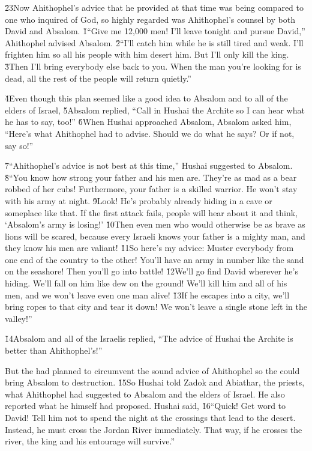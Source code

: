 \v{23}Now Ahithophel's advice that he provided at that time was being compared to one who inquired of God, so highly regarded was Ahithophel's counsel by both David and Absalom.
\v{1}``Give me 12,000 men! I'll leave tonight and pursue David,'' Ahithophel advised Absalom. \v{2}``I'll catch him while he is still tired and weak. I'll frighten him so all his people with him desert him. But I'll only kill the king. \v{3}Then I'll bring everybody else back to you. When the man you're looking for is dead, all the rest of the people will return quietly.''

\v{4}Even though this plan seemed like a good idea to Absalom and to all of the elders of Israel, \v{5}Absalom replied, ``Call in Hushai the Archite so I can hear what he has to say, too!'' \v{6}When Hushai approached Absalom, Absalom asked him, ``Here's what Ahithophel had to advise. Should we do what he says? Or if not, say so!''

\v{7}``Ahithophel's advice is not best at this time,'' Hushai suggested to Absalom. \v{8}``You know how strong your father and his men are. They're as mad as a bear robbed of her cubs! Furthermore, your father is a skilled warrior. He won't stay with his army at night. \v{9}Look! He's probably already hiding in a cave or someplace like that. If the first attack fails, people will hear about it and think, `Absalom's army is losing!' \v{10}Then even men who would otherwise be as brave as lions will be scared, because every Israeli knows your father is a mighty man, and they know his men are valiant! \v{11}So here's my advice: Muster everybody from one end of the country to the other! You'll have an army in number like the sand on the seashore! Then you'll go into battle! \v{12}We'll go find David wherever he's hiding. We'll fall on him like dew on the ground! We'll kill him and all of his men, and we won't leave even one man alive! \v{13}If he escapes into a city, we'll bring ropes to that city and tear it down! We won't leave a single stone left in the valley!''

\v{14}Absalom and all of the Israelis replied, ``The advice of Hushai the Archite is better than Ahithophel's!''

But the  had planned to circumvent the sound advice of Ahithophel so the  could bring Absalom to destruction. \v{15}So Hushai told Zadok and Abiathar, the priests, what Ahithophel had suggested to Absalom and the elders of Israel. He also reported what he himself had proposed. Hushai said, \v{16}``Quick! Get word to David! Tell him not to spend the night at the crossings that lead to the desert. Instead, he must cross the Jordan River immediately. That way, if he crosses the river, the king and his entourage will survive.''

